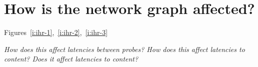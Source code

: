 \section{How is the network graph affected?}

Figures~\ref{i:ihr-1},~\ref{i:ihr-2},~\ref{i:ihr-3}


\textit{How does this affect latencies between probes? How does this affect
latencies to content? Does it affect latencies to content?}

\begin{figure}[tp]
\centering
{}




\end{figure}
